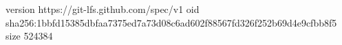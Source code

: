version https://git-lfs.github.com/spec/v1
oid sha256:1bbfd15385dbfaa7375ed7a73d08c6ad602f88567fd326f252b69d4e9cfbb8f5
size 524384
